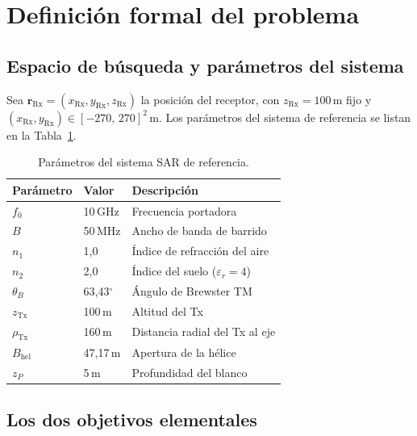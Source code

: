 \documentclass[11pt, a4paper]{article}
\newcommand{\Rx}{\mathrm{Rx}}
\newcommand{\Tx}{\mathrm{Tx}}
\newcommand{\rRx}{\mathbf{r}_{\Rx}}
\newcommand{\gdeg}{\ensuremath{^{\circ}}}
\begin{document}
\section{Definición formal del problema}

\subsection{Espacio de búsqueda y parámetros del sistema}

Sea $\rRx = (x_{\Rx}, y_{\Rx}, z_{\Rx})$ la posición del receptor, con
$z_{\Rx} = 100\,\mathrm{m}$ fijo y $(x_{\Rx}, y_{\Rx}) \in [-270,\,270]^2\,\mathrm{m}$.
Los parámetros del sistema de referencia se listan en la Tabla~\ref{tab:params}.

\begin{table}[H]
  \centering
  \caption{Parámetros del sistema SAR de referencia.}
  \label{tab:params}

  \begin{tabular}{@{}lll@{}}
    \toprule
    \textbf{Parámetro} & \textbf{Valor} & \textbf{Descripción} \\
    \midrule
    $f_0$        & 10\,GHz  & Frecuencia portadora \\
    $B$          & 50\,MHz  & Ancho de banda de barrido \\
    $n_1$        & 1{,}0    & Índice de refracción del aire \\
    $n_2$        & 2{,}0    & Índice del suelo ($\varepsilon_r = 4$) \\
    $\theta_B$   & 63{,}43\gdeg & Ángulo de Brewster TM \\
    $z_{\Tx}$   & 100\,m   & Altitud del Tx \\
    $\rho_{\Tx}$& 160\,m   & Distancia radial del Tx al eje \\
    $B_\mathrm{hel}$ & 47{,}17\,m & Apertura de la hélice \\
    $z_P$        & 5\,m     & Profundidad del blanco \\
    \bottomrule
  \end{tabular}
\end{table}

\subsection{Los dos objetivos elementales}
\end{document}
